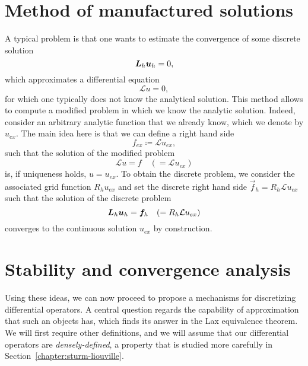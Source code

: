 \section{Method of manufactured solutions}\label{sec:manufactured-solutions}
A typical problem is that one wants to estimate the convergence of some discrete solution
\begin{equation}
    \mat L_h \vec u_h = 0,
\end{equation}
which approximates a differential equation
\begin{equation}
    \mathcal L u = 0,
\end{equation}
for which one typically does not know the analytical solution. This method allows to compute a modified problem in which we know the analytic solution. Indeed, consider an arbitrary analytic function that we already know, which we denote by $u_{ex}$. The main idea here is that we can define a right hand side 
\begin{equation}
    f_{ex} \coloneqq \mathcal L u_{ex},
\end{equation}
such that the solution of the modified problem 
\begin{equation}
    \mathcal L u = f \quad ( = \mathcal L u_{ex})
\end{equation}
is, if uniqueness holds, $u = u_{ex}$. To obtain the discrete problem, we consider the associated grid function $R_h u_{ex}$ and set the discrete right hand side $\vec f_h = R_h \mathcal L u_{ex}$ such that the solution of the discrete problem 
\begin{equation}
    \mat L_h \vec u_h = \vec f_h \quad (=R_h \mathcal L u_{ex})
\end{equation}
converges to the continuous solution $u_{ex}$ by construction. 

\section{Stability and convergence analysis}\label{sec:fd-convergence-analysiss}
Using these ideas, we can now proceed to propose a mechanisms for discretizing differential operators. A central question regards the capability of approximation that such an objects has, which finds its answer in the Lax equivalence theorem. We will first require other definitions, and we will assume that our differential operators are \emph{densely-defined}, a property that is studied more carefully in Section~\ref{chapter:sturm-liouville}.

